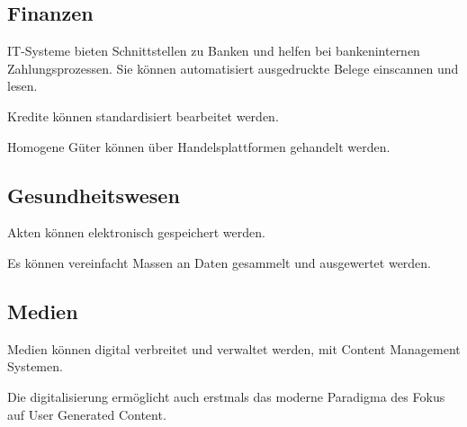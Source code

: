 \documentclass{article}
\begin{document}
\subsection{Finanzen}
IT-Systeme bieten Schnittstellen zu Banken und helfen bei bankeninternen Zahlungsprozessen. Sie können automatisiert ausgedruckte Belege einscannen und lesen.

Kredite können standardisiert bearbeitet werden.

Homogene Güter können über Handelsplattformen gehandelt werden.

\subsection{Gesundheitswesen}
Akten können elektronisch gespeichert werden.

Es können vereinfacht Massen an Daten gesammelt und ausgewertet werden.

\subsection{Medien}
Medien können digital verbreitet und verwaltet werden, mit Content Management Systemen.

Die digitalisierung ermöglicht auch erstmals das moderne Paradigma des Fokus auf User Generated Content.
\end{document}
